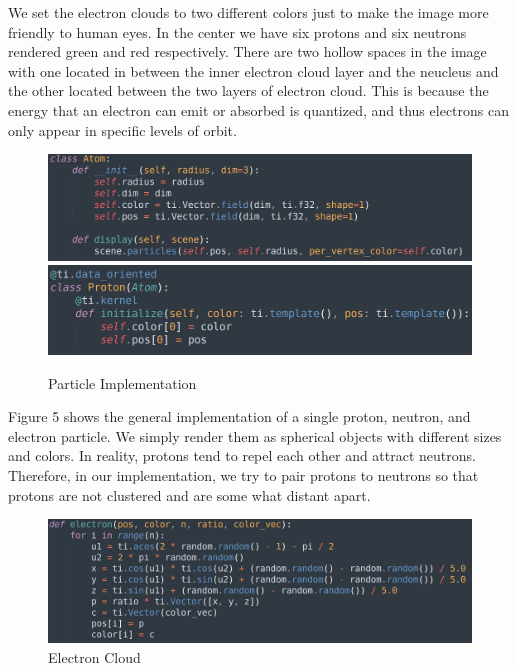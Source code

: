 \documentclass[acmtog]{acmart}
\begin{document}
We set the electron clouds to two different colors just to make the image more friendly to human eyes. In the center we have six protons and six neutrons rendered green and red respectively. There are two hollow spaces in the image with one located in between the inner electron cloud layer and the neucleus and the other located between the two layers of electron cloud. This is because the energy that an electron can emit or absorbed is quantized, and thus electrons can only appear in specific levels of orbit. 

\begin{figure}[h]
  \centering
  \includegraphics[width=\linewidth]{./atom.png}
  \includegraphics[width=\linewidth]{./proton.png}
  \caption{Particle Implementation}
\end{figure}

Figure 5 shows the general implementation of a single proton, neutron, and electron particle. We simply render them as spherical objects with different sizes and colors. In reality, protons tend to repel each other and attract neutrons. Therefore, in our implementation, we try to pair protons to neutrons so that protons are not clustered and are some what distant apart.

\begin{figure}[h]
  \centering
  \includegraphics[width=\linewidth]{./electron_cloud.png}
  \caption{Electron Cloud}
\end{figure}
\end{document}
